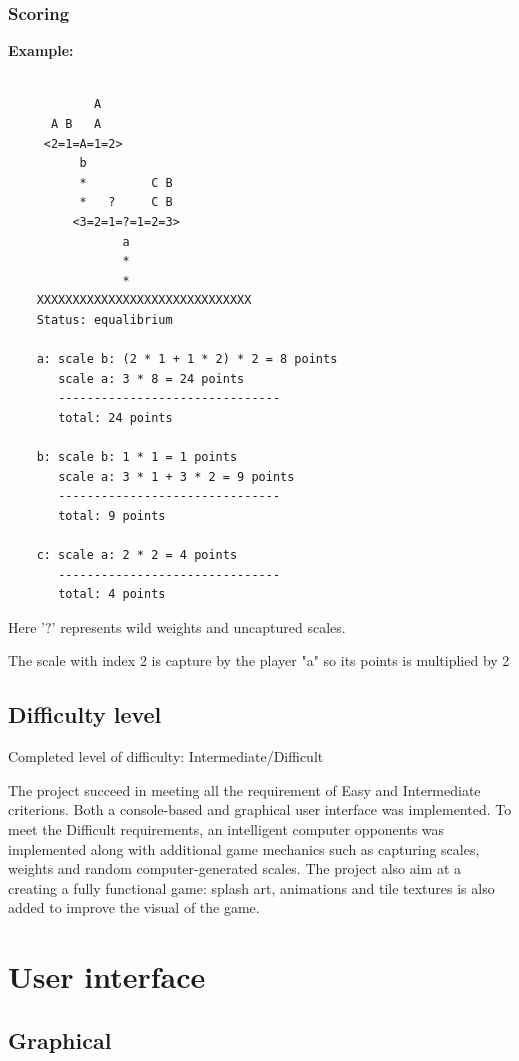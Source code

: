 \documentclass[12pt]{article}
\begin{document}
\subsubsection{Scoring}

\textbf{Example:} 
\begin{verbatim}

            A
      A B   A
     <2=1=A=1=2>
          b          
          *         C B
          *   ?     C B
         <3=2=1=?=1=2=3>
                a
                *
                *
    XXXXXXXXXXXXXXXXXXXXXXXXXXXXXX
    Status: equalibrium 

    a: scale b: (2 * 1 + 1 * 2) * 2 = 8 points 
       scale a: 3 * 8 = 24 points
       -------------------------------
       total: 24 points

    b: scale b: 1 * 1 = 1 points
       scale a: 3 * 1 + 3 * 2 = 9 points
       -------------------------------
       total: 9 points

    c: scale a: 2 * 2 = 4 points
       -------------------------------
       total: 4 points
\end{verbatim}

Here '$?$' represents wild weights and uncaptured scales. 

The scale with index 2 is capture by the player "a" so its points is multiplied
by 2

\subsection{Difficulty level}
Completed level of difficulty: Intermediate/Difficult

The project succeed in meeting all the requirement of Easy and Intermediate
criterions. Both a console-based and graphical user interface was implemented.
To meet the Difficult requirements, an intelligent computer opponents was
implemented along with additional game mechanics such as capturing scales, 
weights and random computer-generated scales. The project also aim at a creating
a fully functional game: splash art, animations and tile textures is also added
to improve the visual of the game.



\section{User interface}

\subsection{Graphical}
\end{document}
